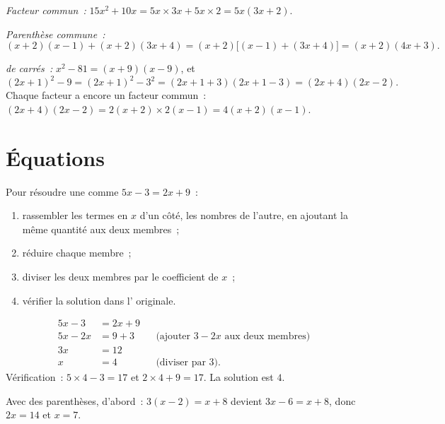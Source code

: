 \begin{example}\label{ex:g9:algebra:factor}
\emph{Facteur commun~:}
$15x^2 + 10x = 5x \times 3x + 5x \times 2 = 5x(3x + 2)$.

\emph{Parenthèse commune~:}
\[
(x+2)(x-1) + (x+2)(3x+4) = (x+2)\bigl[(x-1) + (3x+4)\bigr]
= (x+2)(4x+3).
\]

\emph{ de carrés~:}
$x^2 - 81 = (x+9)(x-9)$, et
\[
(2x+1)^2 - 9 = (2x+1)^2 - 3^2 = (2x+1+3)(2x+1-3) = (2x+4)(2x-2).
\]
Chaque facteur a encore un facteur commun~: $(2x+4)(2x-2) = 2(x+2) \times
2(x-1) = 4(x+2)(x-1)$.
\end{example}

\section{Équations}

\begin{method}\label{met:g9:algebra:firstdegree}
Pour résoudre une  comme $5x - 3 = 2x + 9$~:
\begin{enumerate}
  \item rassembler les termes en $x$ d'un côté, les nombres de l'autre,
        en ajoutant la même quantité aux deux membres~;
  \item réduire chaque membre~;
  \item diviser les deux membres par le coefficient de $x$~;
  \item vérifier la solution dans l' originale.
\end{enumerate}
\end{method}

\begin{example}\label{ex:g9:algebra:firstdegree}
\begin{align*}
5x - 3 &= 2x + 9 \\
5x - 2x &= 9 + 3 && \text{(ajouter $3 - 2x$ aux deux membres)}\\
3x &= 12 \\
x &= 4 && \text{(diviser par 3).}
\end{align*}
Vérification~: $5 \times 4 - 3 = 17$ et $2 \times 4 + 9 = 17$. La
solution est $4$.

Avec des parenthèses,  d'abord~: $3(x - 2) = x + 8$ devient
$3x - 6 = x + 8$, donc $2x = 14$ et $x = 7$.
\end{example}

